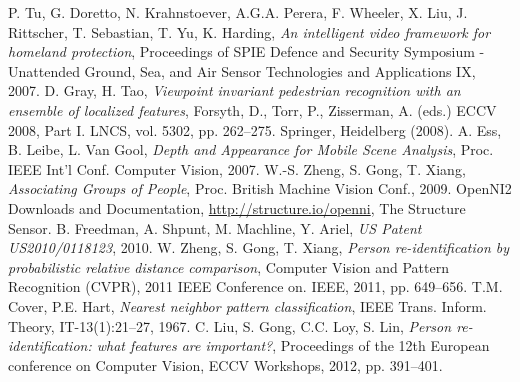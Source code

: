 \documentclass[letterpaper, 11pt, conference]{ieeeconf} %
\begin{document}
\begin{thebibliography}{9}
P. Tu, G. Doretto, N. Krahnstoever, A.G.A. Perera, F. Wheeler, X. Liu, J. Rittscher, T. Sebastian, T. Yu, K. Harding, \emph{An intelligent video framework for homeland protection}, Proceedings of SPIE Defence and Security Symposium - Unattended Ground, Sea, and Air Sensor Technologies and Applications IX, 2007.
D. Gray, H. Tao, \emph{Viewpoint invariant pedestrian recognition with an ensemble of localized features}, Forsyth, D., Torr, P., Zisserman, A. (eds.) ECCV 2008, Part I. LNCS, vol. 5302, pp. 262–275. Springer, Heidelberg (2008).
A. Ess, B. Leibe, L. Van Gool, \emph{Depth and Appearance for
Mobile Scene Analysis}, Proc. IEEE Int’l Conf. Computer Vision, 2007.
W.-S. Zheng, S. Gong, T. Xiang, \emph{Associating Groups of People}, Proc. British Machine Vision Conf., 2009.
OpenNI2 Downloads and Documentation, \url{http://structure.io/openni}, The Structure Sensor.
B. Freedman, A. Shpunt, M. Machline, Y. Ariel, \emph{US Patent US2010/0118123}, 2010.
W. Zheng, S. Gong, T. Xiang, \emph{Person re-identification by probabilistic relative distance comparison}, Computer Vision and Pattern Recognition (CVPR), 2011 IEEE Conference on. IEEE, 2011, pp. 649–656.
T.M. Cover, P.E. Hart, \emph{Nearest neighbor pattern classification}, IEEE Trans. Inform. Theory, IT-13(1):21–27, 1967.
C. Liu, S. Gong, C.C. Loy, S. Lin, \emph{Person re-identification: what features are important?}, Proceedings of the 12th European conference on Computer Vision, ECCV Workshops, 2012, pp. 391–401.
\end{thebibliography}
\end{document}
